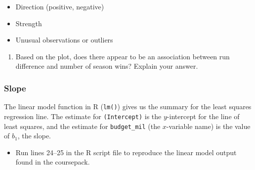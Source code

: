 \documentclass[
]{report}
\newenvironment{Shaded}{\begin{snugshade}}{\end{snugshade}}
\newcommand{\AttributeTok}[1]{\textcolor[rgb]{0.13,0.29,0.53}{#1}}
\newcommand{\CommentTok}[1]{\textcolor[rgb]{0.56,0.35,0.01}{\textit{#1}}}
\newcommand{\DecValTok}[1]{\textcolor[rgb]{0.00,0.00,0.81}{#1}}
\newcommand{\FunctionTok}[1]{\textcolor[rgb]{0.13,0.29,0.53}{\textbf{#1}}}
\newcommand{\NormalTok}[1]{#1}
\newcommand{\OtherTok}[1]{\textcolor[rgb]{0.56,0.35,0.01}{#1}}
\newcommand{\SpecialCharTok}[1]{\textcolor[rgb]{0.81,0.36,0.00}{\textbf{#1}}}
\providecommand{\tightlist}{%
  \setlength{\itemsep}{0pt}\setlength{\parskip}{0pt}}
\begin{document}
\vspace{.075in}

\begin{itemize}
\tightlist
\item
  Direction (positive, negative)
\end{itemize}

\vspace{.075in}

\begin{itemize}
\tightlist
\item
  Strength
\end{itemize}

\vspace{.075in}

\begin{itemize}
\tightlist
\item
  Unusual observations or outliers
\end{itemize}

\vspace{.075in}

\begin{enumerate}
\def\labelenumi{\arabic{enumi}.}
\setcounter{enumi}{1}
\tightlist
\item
  Based on the plot, does there appear to be an association between run difference and number of season wins? Explain your answer.
\end{enumerate}

\vspace{1in}

\subsubsection*{Slope}\label{slope-1}

The linear model function in R (\texttt{lm()}) gives us the summary for the least squares regression line. The estimate for \texttt{(Intercept)} is the \(y\)-intercept for the line of least squares, and the estimate for \texttt{budget\_mil} (the \(x\)-variable name) is the value of \(b_1\), the slope.

\begin{itemize}
\tightlist
\item
  Run lines 24--25 in the R script file to reproduce the linear model output found in the coursepack.
\end{itemize}

\begin{Shaded}
\end{Shaded}
\end{document}
